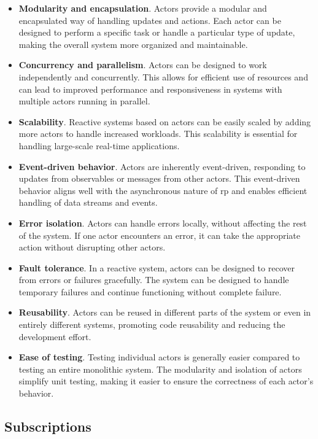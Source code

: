 \begin{itemize}
  \item \textbf{Modularity and encapsulation}. Actors provide a modular and
        encapsulated way of handling updates and actions.
        Each actor can be designed to perform a specific task or handle a particular type of update,
        making the overall system more organized and maintainable.
  \item \textbf{Concurrency and parallelism}.
        Actors can be designed to work independently and concurrently.
        This allows for efficient use of resources and can lead to improved performance and
        responsiveness in systems with multiple actors running in parallel.
  \item \textbf{Scalability}.
        Reactive systems based on actors can be easily scaled by adding more actors to handle increased workloads.
        This scalability is essential for handling large-scale real-time applications.
  \item \textbf{Event-driven behavior}.
        Actors are inherently event-driven, responding to updates from observables or messages from other actors.
        This event-driven behavior aligns well with the asynchronous nature of \ac{rp} and enables efficient handling of data streams and events.
  \item \textbf{Error isolation}.
        Actors can handle errors locally, without affecting the rest of the system.
        If one actor encounters an error, it can take the appropriate action without disrupting other actors.
  \item \textbf{Fault tolerance}.
        In a reactive system, actors can be designed to recover from errors or failures gracefully.
        The system can be designed to handle temporary failures and continue functioning without complete failure.
  \item \textbf{Reusability}.
        Actors can be reused in different parts of the system or even in entirely different systems,
        promoting code reusability and reducing the development effort.
  \item \textbf{Ease of testing}.
        Testing individual actors is generally easier compared to testing an entire monolithic system.
        The modularity and isolation of actors simplify unit testing, making it easier to ensure the correctness of each actor's behavior.
\end{itemize}

\subsection{Subscriptions}

